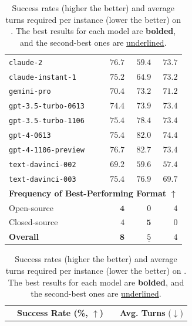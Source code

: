 \begin{table}[bpth]
\begin{minipage}{0.40\textwidth}
\begin{adjustbox}{max width=\textwidth}
\begin{tabular}{@{} l rrr @{}}
\texttt{claude-2}                  &     $\mathbf{76.7}$ &              $59.4$ &  \underline{$73.7$} \\
\texttt{claude-instant-1}          &     $\mathbf{75.2}$ &              $64.9$ &  \underline{$73.2$} \\
\texttt{gemini-pro}                &              $70.4$ &     $\mathbf{73.2}$ &  \underline{$71.2$} \\
\texttt{gpt-3.5-turbo-0613}        &     $\mathbf{74.4}$ &  \underline{$73.9$} &              $73.4$ \\
\texttt{gpt-3.5-turbo-1106}        &  \underline{$75.4$} &     $\mathbf{78.4}$ &              $73.4$ \\
\texttt{gpt-4-0613}                &  \underline{$75.4$} &     $\mathbf{82.0}$ &              $74.4$ \\
\texttt{gpt-4-1106-preview}        &  \underline{$76.7$} &     $\mathbf{82.7}$ &              $73.4$ \\
\texttt{text-davinci-002}          &     $\mathbf{69.2}$ &  \underline{$59.6$} &              $57.4$ \\
\texttt{text-davinci-003}          &  \underline{$75.4$} &     $\mathbf{76.9}$ &              $69.7$ \\
\midrule

\multicolumn{4}{c}{\textbf{Frequency of Best-Performing Format} $\uparrow$} \\
Open-source & $\mathbf{4}$ & $0$ & \underline{$4$} \\
Closed-source & \underline{$4$} & $\mathbf{5}$ & $0$ \\
\textbf{Overall} & $\mathbf{8}$ & $\underline{5}$ & $4$ \\
\bottomrule
\end{tabular}
\end{adjustbox}

\end{minipage}\hfill%
\begin{minipage}{0.58\textwidth}
\centering
\caption{Success rates (higher the better) and average turns required per instance (lower the better) on \evalname. The best results for each model are \textbf{bolded}, and the second-best ones are \underline{underlined}.
}
\vspace{-5pt}
\label{tab:zeroshot_act_results}
\begin{adjustbox}{max width=\textwidth}
\begin{tabular}{@{} l rrr  m{0.01em}  rrr @{}}
\toprule
{} & \multicolumn{3}{c}{\textbf{Success Rate (\%, $\uparrow$)}} && \multicolumn{3}{c}{\textbf{Avg. Turns} ($\downarrow$)} \\
\cmidrule{2-4}
\cmidrule{6-8}


\end{tabular}
\end{adjustbox}
\end{minipage}
\end{table}
